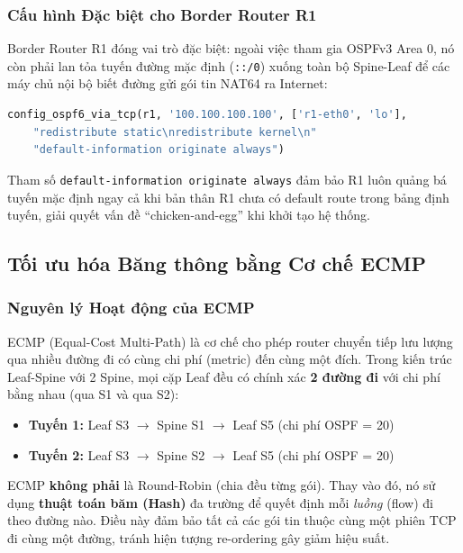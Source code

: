 \subsubsection{Cấu hình Đặc biệt cho Border Router R1}

Border Router R1 đóng vai trò đặc biệt: ngoài việc tham gia OSPFv3 Area 0, nó còn phải lan tỏa tuyến đường mặc định (\texttt{::/0}) xuống toàn bộ Spine-Leaf để các máy chủ nội bộ biết đường gửi gói tin NAT64 ra Internet:

\begin{lstlisting}[style=customcode, language=Python, caption={Cấu hình Redistribute và Default Route trên R1.}, label=lst:r1_config]
config_ospf6_via_tcp(r1, '100.100.100.100', ['r1-eth0', 'lo'], 
    "redistribute static\nredistribute kernel\n"
    "default-information originate always")
\end{lstlisting}

Tham số \texttt{default-information originate always} đảm bảo R1 luôn quảng bá tuyến mặc định ngay cả khi bản thân R1 chưa có default route trong bảng định tuyến, giải quyết vấn đề ``chicken-and-egg'' khi khởi tạo hệ thống.

\subsection{Tối ưu hóa Băng thông bằng Cơ chế ECMP}

\subsubsection{Nguyên lý Hoạt động của ECMP}

ECMP (Equal-Cost Multi-Path) là cơ chế cho phép router chuyển tiếp lưu lượng qua nhiều đường đi có cùng chi phí (metric) đến cùng một đích. Trong kiến trúc Leaf-Spine với 2 Spine, mọi cặp Leaf đều có chính xác \textbf{2 đường đi} với chi phí bằng nhau (qua S1 và qua S2):

\begin{itemize}
    \item \textbf{Tuyến 1:} Leaf S3 $\rightarrow$ Spine S1 $\rightarrow$ Leaf S5 (chi phí OSPF = 20)
    \item \textbf{Tuyến 2:} Leaf S3 $\rightarrow$ Spine S2 $\rightarrow$ Leaf S5 (chi phí OSPF = 20)
\end{itemize}

ECMP \textbf{không phải} là Round-Robin (chia đều từng gói). Thay vào đó, nó sử dụng \textbf{thuật toán băm (Hash)} đa trường để quyết định mỗi \textit{luồng} (flow) đi theo đường nào. Điều này đảm bảo tất cả các gói tin thuộc cùng một phiên TCP đi cùng một đường, tránh hiện tượng re-ordering gây giảm hiệu suất.


